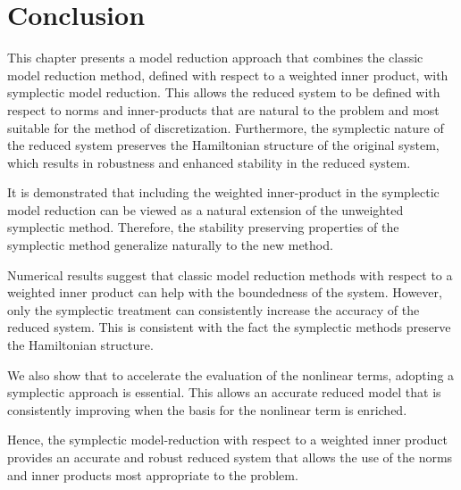 \section{Conclusion} \label{sec:conc}
This chapter presents a model reduction approach that combines the classic model reduction method, defined with respect to a weighted inner product, with symplectic model reduction. This allows the reduced system to be defined with respect to norms and inner-products that are natural to the problem and most suitable for the method of discretization. Furthermore, the symplectic nature of the reduced system preserves the Hamiltonian structure of the original system, which results in robustness and enhanced stability in the reduced system.

It is demonstrated that including the weighted inner-product in the symplectic model reduction can be viewed as a natural extension of the unweighted symplectic method. Therefore, the stability preserving properties of the symplectic method generalize naturally to the new method.

Numerical results suggest that classic model reduction methods with respect to a weighted inner product can help with the boundedness of the system. However, only the symplectic treatment can consistently increase the accuracy of the reduced system. This is consistent with the fact the symplectic methods preserve the Hamiltonian structure.

We also show that to accelerate the evaluation of the nonlinear terms, adopting a symplectic approach is essential. This allows an accurate reduced model that is consistently improving when the basis for the nonlinear term is enriched.

Hence, the symplectic model-reduction with respect to a weighted inner product provides an accurate and robust reduced system that allows the use of the norms and inner products most appropriate to the problem.
